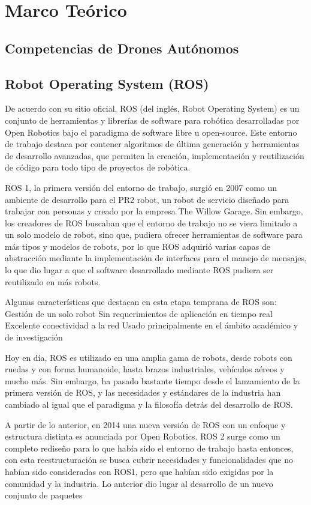\chapter{Marco Teórico}

\section{Competencias de Drones Autónomos}
 
\section{Robot Operating System (ROS)}

De acuerdo con su sitio oficial, ROS (del inglés, Robot Operating System) es un conjunto de herramientas y librerías de software para robótica desarrolladas por Open Robotics bajo el paradigma de software libre u open-source. Este entorno de trabajo destaca por contener algoritmos de última generación y herramientas de desarrollo avanzadas,  que permiten la creación, implementación y reutilización de código para todo tipo de proyectos de robótica.

ROS 1, la primera versión del entorno de trabajo, surgió en 2007 como un ambiente de desarrollo para el PR2 robot, un robot de servicio diseñado para trabajar con personas y creado por la empresa The Willow Garage. Sin embargo, los creadores de ROS buscaban que el entorno de trabajo no se viera limitado a un solo modelo de robot, sino que, pudiera ofrecer herramientas de software para más tipos y modelos de robots, por lo que ROS adquirió varias capas de abstracción mediante la implementación de interfaces para el manejo de mensajes, lo que dio lugar a que el software desarrollado mediante ROS pudiera ser reutilizado en más robots.   

Algunas características que destacan en esta etapa temprana de ROS son:
Gestión de un solo robot
Sin requerimientos de aplicación en tiempo real
Excelente conectividad a la red
Usado principalmente en el ámbito académico y de investigación

Hoy en día, ROS es utilizado en una amplia gama de robots, desde robots con ruedas y con forma humanoide, hasta brazos industriales, vehículos aéreos y mucho más. Sin embargo, ha pasado bastante tiempo desde el lanzamiento de la primera versión de ROS, y las necesidades y estándares de la industria han cambiado al igual que el paradigma y la filosofía detrás del desarrollo de ROS.
   
A partir de lo anterior, en 2014 una nueva versión de ROS con un enfoque y estructura distinta es anunciada por Open Robotics.  ROS 2 surge como un completo rediseño para lo que había sido el entorno de trabajo hasta entonces, con esta reestructuración se busca cubrir necesidades y funcionalidades que no habían sido consideradas con  ROS1, pero que habían sido exigidas por la comunidad y la industria. Lo anterior dio lugar al desarrollo de un nuevo conjunto de paquetes 

